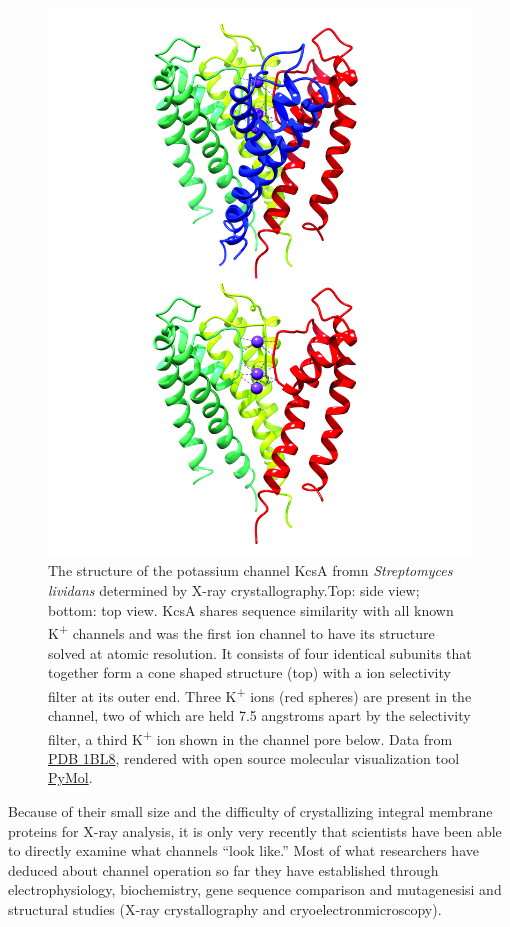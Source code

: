 \begin{figure}

{\centering \includegraphics[width=0.7\linewidth]{./figures/potential/Kcsa} 

}

\caption{The structure of the potassium channel KcsA fromn \emph{Streptomyces lividans} determined by X-ray crystallography.Top: side view; bottom: top view. KcsA shares sequence similarity with all known K\textsuperscript{+} channels and was the first ion channel to have its structure solved at atomic resolution. It consists of four identical subunits that together form a cone shaped structure (top) with a ion selectivity filter at its outer end. Three K\textsuperscript{+} ions (red spheres) are present in the channel, two of which are held 7.5 angstroms apart by the selectivity filter, a third K\textsuperscript{+} ion shown in the channel pore below. Data from \href{https://www.rcsb.org/structure/1BL8}{PDB 1BL8}, rendered with open source molecular visualization tool \href{https://pymol.org/2/}{PyMol}.}\label{fig:kchannel}
\end{figure}

Because of their small size and the difficulty of crystallizing integral membrane proteins for X-ray analysis, it is only very recently that scientists have been able to directly examine what channels ``look like.'' Most of what researchers have deduced about channel operation so far they have established through electrophysiology, biochemistry, gene sequence comparison and mutagenesisi and structural studies (X-ray crystallography and cryoelectronmicroscopy).

